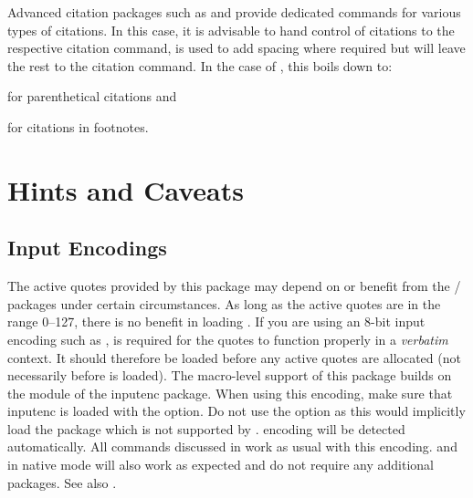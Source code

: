 \documentclass{ltxdockit}[2010/09/26]
\begin{document}
\begin{ltxcode}
\renewcommand{\mkccitation}[1]{ (#1)}
\renewcommand{\mkccitation}[1]{\footnote{#1}}
\end{ltxcode}
%
Advanced citation packages such as  and  provide dedicated commands for various types of citations. In this case, it is advisable to hand control of citations to the respective citation command, \ie {} is used to add spacing where required but will leave the rest to the citation command. In the case of , this boils down to:

\begin{ltxcode}
\SetCiteCommand{\parencite}
\renewcommand{\mkccitation}[1]{ #1}
\end{ltxcode}
%
for parenthetical citations and

\begin{ltxcode}
\SetCiteCommand{\footcite}
\renewcommand{\mkccitation}[1]{#1}
\end{ltxcode}
%
for citations in footnotes.

\section{Hints and Caveats}
\label{hnt}

\subsection{Input Encodings}
\label{hnt:inc}

The active quotes provided by this package may depend on or benefit from the \slash {} packages under certain circumstances. As long as the active quotes are in the range 0--127, there is no benefit in loading . If you are using an 8-bit input encoding such as ,  is required for the quotes to function properly in a \emph{verbatim} context. It should therefore be loaded before any active quotes are allocated (not necessarily before  is loaded). The macro-level \utf support of this package builds on the  module of the inputenc package. When using this encoding, make sure that inputenc is loaded with the  option. Do not use the  option as this would implicitly load the  package which is not supported by . \utf encoding will be detected automatically. All commands discussed in  work as usual with this encoding. \xetex and \luatex in native \utf mode will also work as expected and do not require any additional packages. See also .
\end{document}
